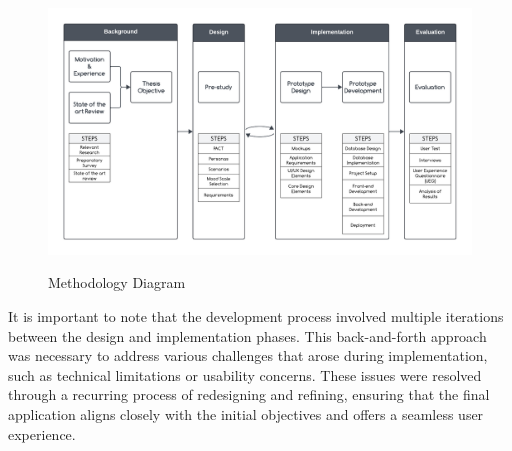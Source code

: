 \FloatBarrier
\begin{figure}[ht]
    \centering
    \includegraphics[width=\linewidth]{figures/Sequence-Diagram.pdf}\label{fig:sequence-diagram}
    \caption{Methodology Diagram}
\end{figure}
\FloatBarrier

\vspace{5mm}

\noindent It is important to note that the development process involved multiple iterations between the design and implementation phases. This back-and-forth approach was necessary to address various challenges that arose during implementation, such as technical limitations or usability concerns. These issues were resolved through a recurring process of redesigning and refining, ensuring that the final application aligns closely with the initial objectives and offers a seamless user experience.